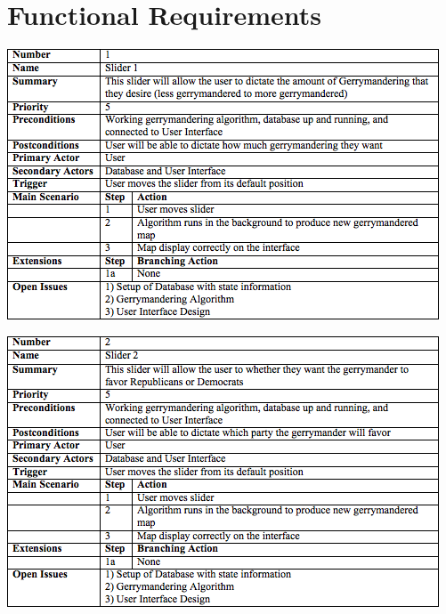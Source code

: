 \documentclass{article}
\begin{document}
\vspace{2.5mm}


\section{Functional Requirements}\label{sec:functionalReq}

\vspace{2.5mm}

\begin{addmargin}[4em]{0em}


\begin{center}
\hspace*{-2cm}      
\includegraphics[scale=.8]{Slider1.png}
\end{center}



\begin{center}
\hspace*{-2cm}      
\includegraphics[scale=.8]{Slider2.png}
\end{center}



\end{addmargin}
\end{document}
